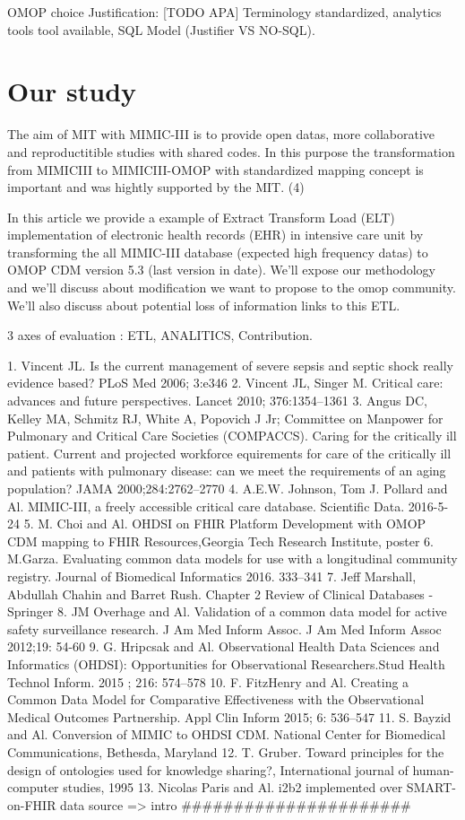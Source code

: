 OMOP choice Justification: {[}TODO APA{]} Terminology standardized,
analytics tools tool available, SQL Model (Justifier VS NO-SQL).

\section{Our study}\label{our-study}

The aim of MIT with MIMIC-III is to provide open datas, more
collaborative and reproductitible studies with shared codes. In this
purpose the transformation from MIMICIII to MIMICIII-OMOP with
standardized mapping concept is important and was hightly supported by
the MIT. (4)

In this article we provide a example of Extract Transform Load (ELT)
implementation of electronic health records (EHR) in intensive care unit
by transforming the all MIMIC-III database (expected high frequency
datas) to OMOP CDM version 5.3 (last version in date). We'll expose our
methodology and we'll discuss about modification we want to propose to
the omop community. We'll also discuss about potential loss of
information links to this ETL.

3 axes of evaluation : ETL, ANALITICS, Contribution.

1. Vincent JL. Is the current management of severe sepsis and septic
shock really evidence based? PLoS Med 2006; 3:e346 2. Vincent JL, Singer
M. Critical care: advances and future perspectives. Lancet 2010;
376:1354--1361 3. Angus DC, Kelley MA, Schmitz RJ, White A, Popovich J
Jr; Committee on Manpower for Pulmonary and Critical Care Societies
(COMPACCS). Caring for the critically ill patient. Current and projected
workforce equirements for care of the critically ill and patients with
pulmonary disease: can we meet the requirements of an aging population?
JAMA 2000;284:2762--2770 4. A.E.W. Johnson, Tom J. Pollard and Al.
MIMIC-III, a freely accessible critical care database. Scientific Data.
2016-5-24 5. M. Choi and Al. OHDSI on FHIR Platform Development with
OMOP CDM mapping to FHIR Resources,Georgia Tech Research Institute,
poster 6. M.Garza. Evaluating common data models for use with a
longitudinal community registry. Journal of Biomedical Informatics 2016.
333--341 7. Jeff Marshall, Abdullah Chahin and Barret Rush. Chapter 2
Review of Clinical Databases - Springer 8. JM Overhage and Al.
Validation of a common data model for active safety surveillance
research. J Am Med Inform Assoc. J Am Med Inform Assoc 2012;19: 54-60 9.
G. Hripcsak and Al. Observational Health Data Sciences and Informatics
(OHDSI): Opportunities for Observational Researchers.Stud Health Technol
Inform. 2015 ; 216: 574--578 10. F. FitzHenry and Al. Creating a Common
Data Model for Comparative Effectiveness with the Observational Medical
Outcomes Partnership. Appl Clin Inform 2015; 6: 536--547 11. S. Bayzid
and Al. Conversion of MIMIC to OHDSI CDM. National Center for Biomedical
Communications, Bethesda, Maryland 12. T. Gruber. Toward principles for
the design of ontologies used for knowledge sharing?, International
journal of human-computer studies, 1995 13. Nicolas Paris and Al. i2b2
implemented over SMART-on-FHIR data source =\textgreater{} intro
\#\#\#\#\#\#\#\#\#\#\#\#\#\#\#\#\#\#\#\#\#\#

